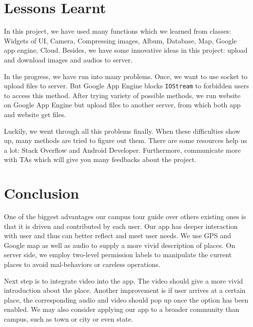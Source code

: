 \documentclass{article}
\begin{document}
\section{Lessons Learnt}
In this project, we have used many functions which we learned from classes: Widgets of UI, Camera, Compressing images, Album, Database, Map, Google app engine, Cloud. Besides, we have some innovative ideas in this project: upload and download images and audios to server.

In the progress, we have run into many problems. Once, we want to use socket to upload files to server. But Google App Engine blocks \verb`IOStream` to forbidden users to access this method. After trying variety of possible methods, we run website on Google App Engine but upload files to another server, from which both app and website get files.

Luckily, we went through all this problems finally. When these difficulties show up, many methods are tried to figure out them. There are some resources help us a lot: Stack Overflow and Android Developer. Furthermore, communicate more with TAs which will give you many feedbacks about the project.

\section{Conclusion}
One of the biggest advantages our campus tour guide over others existing ones is that it is driven and contributed by each user. Our app has deeper interaction with user and thus can better reflect and meet user needs. We use GPS and Google map as well as audio to supply a more vivid description of places. On server side, we employ two-level permission labels to manipulate the current places to avoid mal-behaviors or careless operations.

Next step is to integrate video into the app. The video should give a more vivid introduction about the place. Another improvement is if user arrives at a certain place, the corresponding audio and video should pop up once the option has been enabled. We may also consider applying our app to a broader community than campus, such as town or city or even state.
\end{document}

